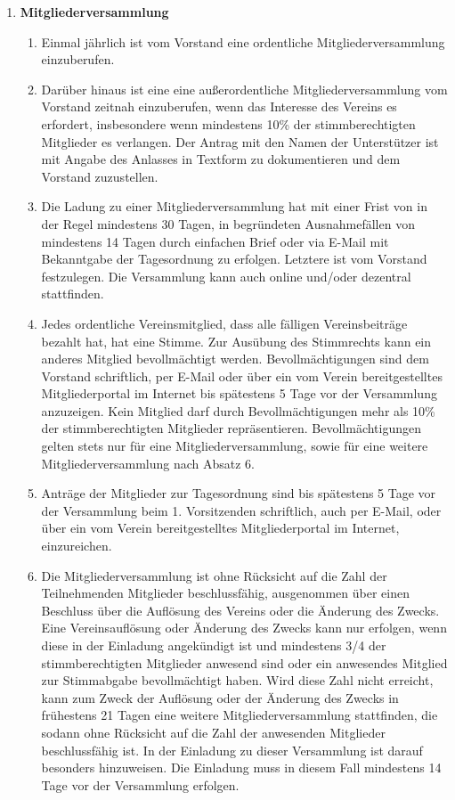 \documentclass{article}
\begin{document}
\begin{enumerate}[§ 1.]
\item \textsf{\textbf{Mitgliederversammlung}}
	\begin{enumerate}[1.]
	\item Einmal jährlich ist vom Vorstand eine ordentliche Mitgliederversammlung
einzuberufen.
	\item Darüber hinaus ist eine eine außerordentliche Mitgliederversammlung vom Vorstand zeitnah einzuberufen, wenn das Interesse des Vereins es erfordert, insbesondere wenn mindestens 10\% der stimmberechtigten Mitglieder es verlangen. Der Antrag mit den Namen der Unterstützer ist mit Angabe des Anlasses in Textform zu dokumentieren und dem Vorstand zuzustellen.
	\item Die Ladung zu einer Mitgliederversammlung hat mit einer Frist von in der Regel mindestens 30 Tagen, in begründeten Ausnahmefällen von mindestens 14 Tagen durch einfachen Brief oder via E-Mail mit Bekanntgabe der Tagesordnung zu erfolgen. Letztere ist vom Vorstand festzulegen. Die Versammlung kann auch online und/oder dezentral stattfinden.
	\item Jedes ordentliche Vereinsmitglied, dass alle fälligen Vereinsbeiträge bezahlt hat, hat eine Stimme. Zur Ausübung des Stimmrechts kann ein anderes Mitglied bevollmächtigt werden. Bevollmächtigungen sind dem Vorstand schriftlich, per E-Mail oder über ein vom Verein bereitgestelltes Mitgliederportal im Internet bis spätestens 5 Tage vor der Versammlung anzuzeigen. Kein Mitglied darf durch Bevollmächtigungen mehr als 10\% der stimmberechtigten Mitglieder repräsentieren. Bevollmächtigungen gelten stets nur für eine Mitgliederversammlung, sowie für eine weitere Mitgliederversammlung nach Absatz 6. 
	\item Anträge der Mitglieder zur Tagesordnung sind bis spätestens 5 Tage vor der Versammlung beim 1. Vorsitzenden schriftlich, auch per E-Mail, oder über ein vom Verein bereitgestelltes Mitgliederportal im Internet, einzureichen.
	\item Die Mitgliederversammlung ist ohne Rücksicht auf die Zahl der Teilnehmenden Mitglieder beschlussfähig, ausgenommen über einen Beschluss über die Auflösung des Vereins oder die Änderung des Zwecks. Eine Vereinsauflösung oder Änderung des Zwecks kann nur erfolgen, wenn diese in der Einladung angekündigt ist und mindestens 3/4 der stimmberechtigten Mitglieder anwesend sind oder ein anwesendes Mitglied zur Stimmabgabe bevollmächtigt haben. Wird diese Zahl nicht erreicht, kann zum Zweck der Auflösung oder der Änderung des Zwecks in frühestens 21 Tagen eine weitere Mitgliederversammlung stattfinden, die sodann ohne Rücksicht auf die Zahl der anwesenden Mitglieder beschlussfähig ist. In der Einladung zu dieser Versammlung ist darauf besonders hinzuweisen. Die Einladung muss in diesem Fall mindestens 14 Tage vor der Versammlung erfolgen.

\end{enumerate}
\end{enumerate}
\end{document}
